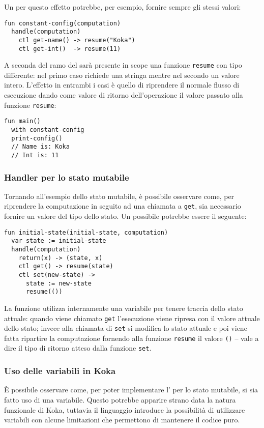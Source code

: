 Un  per questo effetto potrebbe, per esempio, fornire sempre gli stessi valori:
\begin{lstlisting}[language=koka]
fun constant-config(computation)
  handle(computation)
    ctl get-name() -> resume("Koka")
    ctl get-int()  -> resume(11)
\end{lstlisting}
A seconda del ramo del  sarà presente in scope una funzione \lstinline{resume} con tipo differente: nel primo caso richiede una stringa mentre nel secondo un valore intero.
L'effetto in entrambi i casi è quello di riprendere il normale flusso di esecuzione dando come valore di ritorno dell'operazione il valore passato alla funzione \lstinline{resume}:
\begin{lstlisting}[language=koka]
fun main()
  with constant-config
  print-config()
  // Name is: Koka
  // Int is: 11
\end{lstlisting}

\subsubsection{Handler per lo stato mutabile}
Tornando all'esempio dello stato mutabile, è possibile osservare come, per riprendere la computazione in seguito ad una chiamata a \lstinline{get}, sia necessario fornire un valore del tipo dello stato.
Un possibile  potrebbe essere il seguente:
\begin{lstlisting}[language=koka]
fun initial-state(initial-state, computation)
  var state := initial-state
  handle(computation) 
    return(x) -> (state, x)
    ctl get() -> resume(state)
    ctl set(new-state) ->
      state := new-state
      resume(())
\end{lstlisting}

La funzione utilizza internamente una variabile per tenere traccia dello stato attuale: quando viene chiamato \lstinline{get} l'esecuzione viene ripresa con il valore attuale dello stato; invece alla chiamata di \lstinline{set} si modifica lo stato attuale e poi viene fatta ripartire la computazione fornendo alla funzione \lstinline{resume} il valore \lstinline{()} -- vale a dire il tipo di ritorno atteso dalla funzione \lstinline{set}.

\subsubsection{Uso delle variabili in Koka}
È possibile osservare come, per poter implementare l' per lo stato mutabile, si sia fatto uso di una variabile.
Questo potrebbe apparire strano data la natura funzionale di Koka, tuttavia il linguaggio introduce la possibilità di utilizzare variabili con alcune limitazioni che permettono di mantenere il codice puro.

